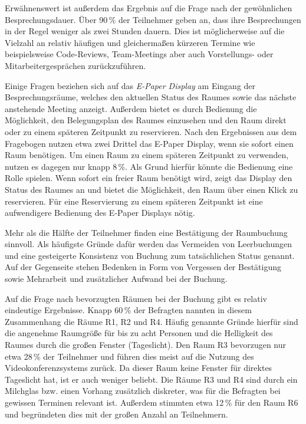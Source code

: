 Erwähnenswert ist außerdem das Ergebnis auf die Frage nach der gewöhnlichen Besprechungsdauer. Über 90\,\% der Teilnehmer geben an, dass ihre Besprechungen in der Regel weniger als zwei Stunden dauern. Dies ist möglicherweise auf die Vielzahl an relativ häufigen und gleichermaßen kürzeren Termine wie beispielsweise Code-Reviews, Team-Meetings aber auch Vorstellungs- oder Mitarbeitergesprächen zurückzuführen. 

Einige Fragen beziehen sich auf das \textit{E-Paper Display} am Eingang der Besprechungsräume, welches den aktuellen Status des Raumes sowie das nächste anstehende Meeting anzeigt. Außerdem bietet es durch Bedienung die Möglichkeit, den Belegungsplan des Raumes einzusehen und den Raum direkt oder zu einem späteren Zeitpunkt zu reservieren. Nach den Ergebnissen aus dem Fragebogen nutzen etwa zwei Drittel das E-Paper Display, wenn sie sofort einen Raum benötigen. Um einen Raum zu einem späteren Zeitpunkt zu verwenden, nutzen es dagegen nur knapp 8\,\%. Als Grund hierfür könnte die Bedienung eine Rolle spielen. Wenn sofort ein freier Raum benötigt wird, zeigt das Display den Status des Raumes an und bietet die Möglichkeit, den Raum über einen Klick zu reservieren. Für eine Reservierung zu einem späteren Zeitpunkt ist eine aufwendigere Bedienung des E-Paper Displays nötig. 

Mehr als die Hälfte der Teilnehmer finden eine Bestätigung der Raumbuchung sinnvoll. Als häufigste Gründe dafür werden das Vermeiden von Leerbuchungen und eine gesteigerte Konsistenz von Buchung zum tatsächlichen Status genannt. Auf der Gegenseite stehen Bedenken in Form von Vergessen der Bestätigung sowie Mehrarbeit und zusätzlicher Aufwand bei der Buchung. 

Auf die Frage nach bevorzugten Räumen bei der Buchung gibt es relativ eindeutige Ergebnisse. Knapp 60\,\% der Befragten nannten in diesem Zusammenhang die Räume R1, R2 und R4. Häufig genannte Gründe hierfür sind die angenehme Raumgröße für bis zu acht Personen und die Helligkeit des Raumes durch die großen Fenster (Tageslicht). Den Raum R3 bevorzugen nur etwa 28\,\% der Teilnehmer und führen dies meist auf die Nutzung des Videokonferenzsystems zurück. Da dieser Raum keine Fenster für direktes Tageslicht hat, ist er auch weniger beliebt. Die Räume R3 und R4 sind durch ein Milchglas bzw. einen Vorhang zusätzlich diskreter, was für die Befragten bei gewissen Terminen relevant ist. Außerdem stimmten etwa 12\,\% für den Raum R6 und begründeten dies mit der großen Anzahl an Teilnehmern. 

